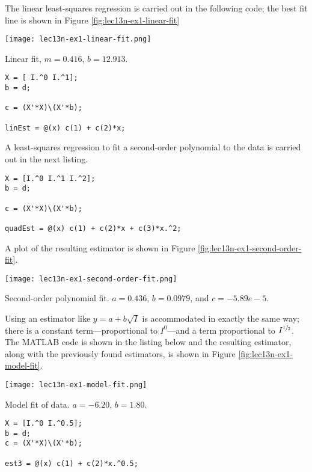 The linear least-squares regression is carried out in the following code; the best fit line is shown in Figure \ref{fig:lec13n-ex1-linear-fit}
\begin{marginfigure}
\texttt{[image: lec13n-ex1-linear-fit.png]}
\caption{Linear fit, $m=0.416$, $b=12.913$.}
\label{fig:lec13n-ex1-linear-fit}
\end{marginfigure}
\begin{lstlisting}[name=lec13n-ex1, style=myMatlab]
X = [ I.^0 I.^1];
b = d;

c = (X'*X)\(X'*b);

linEst = @(x) c(1) + c(2)*x;
\end{lstlisting}
A least-squares regression to fit a second-order polynomial to the data is carried out in the next listing.
\begin{lstlisting}[name=lec13n-ex1,style=myMatlab]
X = [I.^0 I.^1 I.^2];
b = d;

c = (X'*X)\(X'*b);

quadEst = @(x) c(1) + c(2)*x + c(3)*x.^2;
\end{lstlisting}
A plot of the resulting estimator is shown in Figure \ref{fig:lec13n-ex1-second-order-fit}.
\begin{marginfigure}
\texttt{[image: lec13n-ex1-second-order-fit.png]}
\caption{Second-order polynomial fit. $a=0.436$, $b=0.0979$, and $c=-5.89e-5$.}
\label{fig:lec13n-ex1-second-order-fit}  
\end{marginfigure}
Using an estimator like $y = a + b\sqrt{I}$ is accommodated in exactly the same way; there is a constant term---proportional to $I^{0}$---and a term proportional to $I^{\sfrac{1}{2}}$.  The MATLAB code is shown in the listing below and the resulting estimator, along with the previously found estimators, is shown in Figure \ref{fig:lec13n-ex1-model-fit}.

\begin{marginfigure}
\texttt{[image: lec13n-ex1-model-fit.png]}
\caption{Model fit of data.  $a = -6.20$, $b=1.80$.} 
\label{fig:lec13n-ex1-model-fit}
\end{marginfigure}

\begin{lstlisting}[style=myMatlab,name=lec13n-ex1]
X = [I.^0 I.^0.5];
b = d;
c = (X'*X)\(X'*b);

est3 = @(x) c(1) + c(2)*x.^0.5;
\end{lstlisting}

